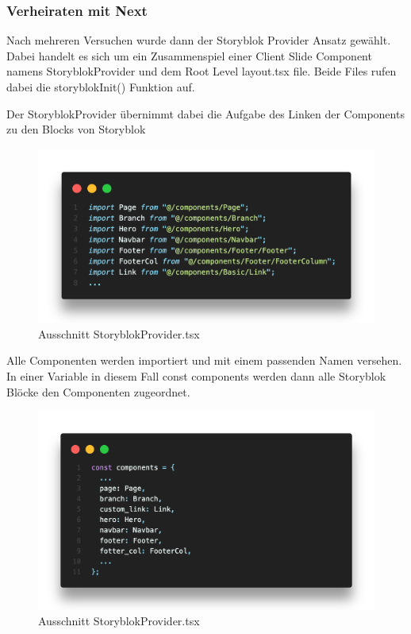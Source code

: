 \subsubsection*{Verheiraten mit Next}
Nach mehreren Versuchen wurde dann der Storyblok Provider Ansatz gewählt. Dabei handelt es sich um ein Zusammenspiel einer Client Slide Component namens StoryblokProvider und dem Root Level layout.tsx file. Beide Files rufen dabei die storyblokInit() Funktion auf. 

Der StoryblokProvider übernimmt dabei die Aufgabe des Linken der Components zu den Blocks von Storyblok

\begin{figure}[H]
    \centering
    \includegraphics[width=\linewidth]{pics/sb-provider-01.png}
    \caption{Ausschnitt StoryblokProvider.tsx}
\end{figure}

Alle Componenten werden importiert und mit einem passenden Namen versehen. In einer Variable in diesem Fall const components werden dann alle Storyblok Blöcke den Componenten zugeordnet.

\begin{figure}[H]
    \centering
    \includegraphics[width=\linewidth]{pics/sb-provider-02.png}
    \caption{Ausschnitt StoryblokProvider.tsx}
\end{figure}


